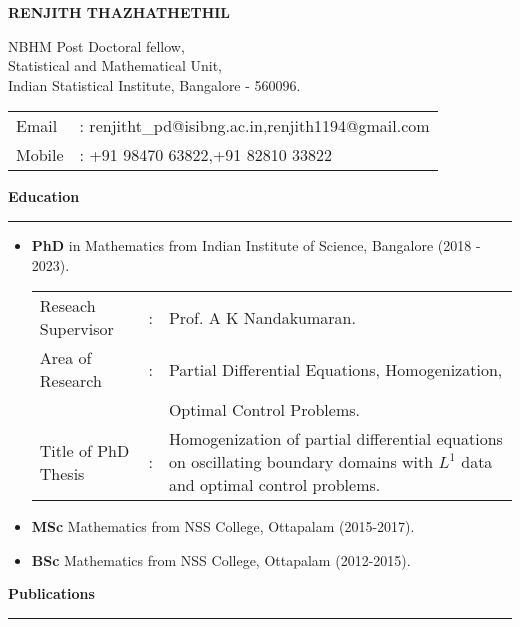 \documentclass[a4paper,11pt]{letter}
\begin{document}
		
	\textbf{\Large RENJITH THAZHATHETHIL}\smallskip
	
	NBHM Post Doctoral fellow,\\
	Statistical and Mathematical Unit,\\
	Indian Statistical Institute, Bangalore - 560096.\smallskip
	
	\hspace*{-0.6em}\begin{tabular}{ll}
		Email&: renjitht\_pd@isibng.ac.in,\quad renjith1194@gmail.com\\
		Mobile&: +91 98470 63822,\quad +91 82810 33822
	\end{tabular}
	
	\textbf{\large Education}\smallskip\hrule
	
	\begin{itemize}
		\item \textbf{PhD} in Mathematics from Indian Institute of Science, Bangalore (2018 - 2023).

		\noindent\begin{tabular}{lll}
			Reseach Supervisor&:&Prof. A K Nandakumaran.\\
			Area of Research&:&Partial Differential Equations, Homogenization, \\
			&&Optimal Control Problems.\\
		Title of PhD Thesis&:&\parbox[t]{0.65\textwidth}{Homogenization of partial differential equations on oscillating boundary domains with $L^1$ data and optimal control problems.}		
		\end{tabular}
		
		\item \textbf{MSc} Mathematics from NSS College, Ottapalam (2015-2017).	
		
		\item \textbf{BSc} Mathematics from NSS College, Ottapalam (2012-2015). 
	\end{itemize}

	\textbf{\large Publications}\smallskip\hrule
	
\end{document}
